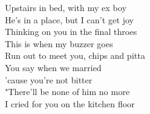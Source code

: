 Upstairs in bed, with my ex boy \\
He's in a place, but I can't get joy \\
Thinking on you in the final throes \\
This is when my buzzer goes \\
Run out to meet you, chips and pitta \\

You say when we married \\
'cause you're not bitter \\
"There'll be none of him no more \\
I cried for you on the kitchen floor \\

